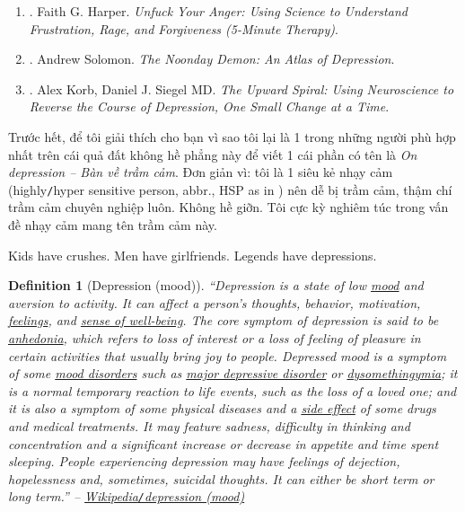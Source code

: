 \documentclass[12pt,oneside]{book}
\newtheorem{definition}{Definition}[section]
\begin{document}
\begin{enumerate}
\begin{itemize}
		{\sf[en]$\to$[vi]} Thông thường, phải mất khoảng 3 tháng để thiết lập lại trạng thái cân bằng sau chấn thương. Tức là, sau khoảng $90$ ngày, các cảm biến cảm xúc của chúng ta không còn hoạt động ở chế độ siêu tốc độ nữa, \& trở lại bình thường.
	\end{itemize}
	\item \cite{Harper_unfuck_anger}. {\sc Faith G. Harper}. {\it Unfuck Your Anger: Using Science to Understand Frustration, Rage, and Forgiveness (5-Minute Therapy)}.
	\item \cite{Solomon_depression}. {\sc Andrew Solomon}. {\it The Noonday Demon: An Atlas of Depression}.
	\item \cite{Korb_Siegel_upward_spiral}. {\sc Alex Korb, Daniel J. Siegel MD}. {\it The Upward Spiral: Using Neuroscience to Reverse the Course of Depression, One Small Change at a Time}.
\end{enumerate}
Trước hết, để tôi giải thích cho bạn vì sao tôi lại là 1 trong những người phù hợp nhất trên cái quả đất không hề phẳng này để viết 1 cái phần có tên là {\it On depression -- Bàn về trầm cảm}. Đơn giản vì: tôi là 1 siêu kẻ nhạy cảm (highly{\tt/}hyper sensitive person, abbr., HSP as in \cite{Aron_HSP}) nên dễ bị trầm cảm, thậm chí trầm cảm chuyên nghiệp luôn. Không hề giỡn. Tôi cực kỳ nghiêm túc trong vấn đề nhạy cảm mang tên trầm cảm này.

Kids have crushes. Men have girlfriends. Legends have depressions.

\begin{definition}[Depression (mood)]
	``\emph{Depression} is a state of low \href{https://en.wikipedia.org/wiki/Mood_(psychology)}{mood} and aversion to activity. It can affect a person's thoughts, behavior, motivation, \href{https://en.wikipedia.org/wiki/Feeling}{feelings}, and \href{https://en.wikipedia.org/wiki/Subjective_well-being}{sense of well-being}. The core symptom of depression is said to be \href{https://en.wikipedia.org/wiki/Anhedonia}{anhedonia}, which refers to loss of interest or a loss of feeling of pleasure in certain activities that usually bring joy to people. Depressed mood is a symptom of some \href{https://en.wikipedia.org/wiki/Mood_disorders}{mood disorders} such as \href{https://en.wikipedia.org/wiki/Major_depressive_disorder}{major depressive disorder} or \href{https://en.wikipedia.org/wiki/Dysomethingymia}{dysomethingymia}; it is a normal temporary reaction to life events, such as the loss of a loved one; and it is also a symptom of some physical diseases and a \href{https://en.wikipedia.org/wiki/Side_effect}{side effect} of some drugs and medical treatments. It may feature sadness, difficulty in thinking and concentration and a significant increase or decrease in appetite and time spent sleeping. People experiencing depression may have feelings of dejection, hopelessness and, sometimes, suicidal thoughts. It can either be short term or long term.'' -- \href{https://en.wikipedia.org/wiki/Depression_(mood)}{Wikipedia{\tt/}depression (mood)}
\end{definition}
\end{document}
